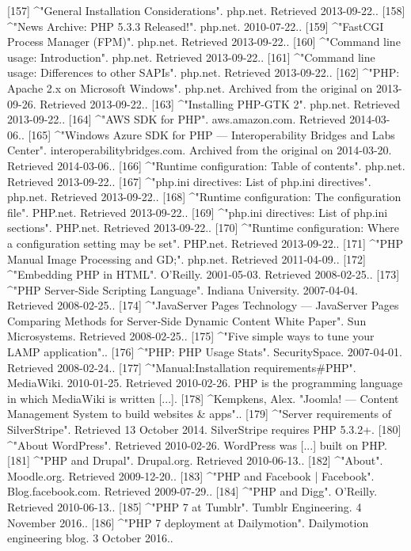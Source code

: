 [157]
^"General Installation Considerations". php.net. Retrieved 2013-09-22..
[158]
^"News Archive: PHP 5.3.3 Released!". php.net. 2010-07-22..
[159]
^"FastCGI Process Manager (FPM)". php.net. Retrieved 2013-09-22..
[160]
^"Command line usage: Introduction". php.net. Retrieved 2013-09-22..
[161]
^"Command line usage: Differences to other SAPIs". php.net. Retrieved 2013-09-22..
[162]
^"PHP: Apache 2.x on Microsoft Windows". php.net. Archived from the original on 2013-09-26. Retrieved 2013-09-22..
[163]
^"Installing PHP-GTK 2". php.net. Retrieved 2013-09-22..
[164]
^"AWS SDK for PHP". aws.amazon.com. Retrieved 2014-03-06..
[165]
^"Windows Azure SDK for PHP — Interoperability Bridges and Labs Center". interoperabilitybridges.com. Archived from the original on 2014-03-20. Retrieved 2014-03-06..
[166]
^"Runtime configuration: Table of contents". php.net. Retrieved 2013-09-22..
[167]
^"php.ini directives: List of php.ini directives". php.net. Retrieved 2013-09-22..
[168]
^"Runtime configuration: The configuration file". PHP.net. Retrieved 2013-09-22..
[169]
^"php.ini directives: List of php.ini sections". PHP.net. Retrieved 2013-09-22..
[170]
^"Runtime configuration: Where a configuration setting may be set". PHP.net. Retrieved 2013-09-22..
[171]
^"PHP Manual Image Processing and GD;". php.net. Retrieved 2011-04-09..
[172]
^"Embedding PHP in HTML". O'Reilly. 2001-05-03. Retrieved 2008-02-25..
[173]
^"PHP Server-Side Scripting Language". Indiana University. 2007-04-04. Retrieved 2008-02-25..
[174]
^"JavaServer Pages Technology — JavaServer Pages Comparing Methods for Server-Side Dynamic Content White Paper". Sun Microsystems. Retrieved 2008-02-25..
[175]
^"Five simple ways to tune your LAMP application"..
[176]
^"PHP: PHP Usage Stats". SecuritySpace. 2007-04-01. Retrieved 2008-02-24..
[177]
^"Manual:Installation requirements#PHP". MediaWiki. 2010-01-25. Retrieved 2010-02-26. PHP is the programming language in which MediaWiki is written [...].
[178]
^Kempkens, Alex. "Joomla! — Content Management System to build websites & apps"..
[179]
^"Server requirements of SilverStripe". Retrieved 13 October 2014. SilverStripe requires PHP 5.3.2+.
[180]
^"About WordPress". Retrieved 2010-02-26. WordPress was [...] built on PHP.
[181]
^"PHP and Drupal". Drupal.org. Retrieved 2010-06-13..
[182]
^"About". Moodle.org. Retrieved 2009-12-20..
[183]
^"PHP and Facebook | Facebook". Blog.facebook.com. Retrieved 2009-07-29..
[184]
^"PHP and Digg". O'Reilly. Retrieved 2010-06-13..
[185]
^"PHP 7 at Tumblr". Tumblr Engineering. 4 November 2016..
[186]
^"PHP 7 deployment at Dailymotion". Dailymotion engineering blog. 3 October 2016..
